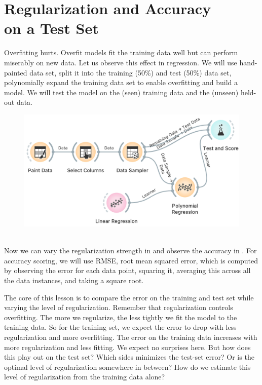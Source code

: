 \chapter{Regularization and Accuracy \\ on a Test Set}
\label{ch:reg-test-set}

Overfitting hurts. Overfit models fit the training data well but can perform miserably on new data. Let us observe this effect in regression. We will use hand-painted data set, split it into the training (50\%) and test (50\%) data set, polynomially expand the training data set to enable overfitting and build a model. We will test the model on the (seen) training data and the (unseen) held-out data.


\begin{figure}[h]
    \centering
    \includegraphics[scale=0.5]{reg-test-set.png}
    \caption{$\;$}
\end{figure}

Now we can vary the regularization strength in  and observe the accuracy in . For accuracy scoring, we will use RMSE, root mean squared error, which is computed by observing the error for each data point, squaring it, averaging this across all the data instances, and taking a square root.

The core of this lesson is to compare the error on the training and test set while varying the level of regularization. Remember that regularization controls overfitting. The more we regularize, the less tightly we fit the model to the training data. So for the training set, we expect the error to drop with less regularization and more overfitting. The error on the training data increases with more regularization and less fitting. We expect no surprises here. But how does this play out on the test set? Which sides minimizes the test-set error? Or is the optimal level of regularization somewhere in between? How do we estimate this level of regularization from the training data alone?

